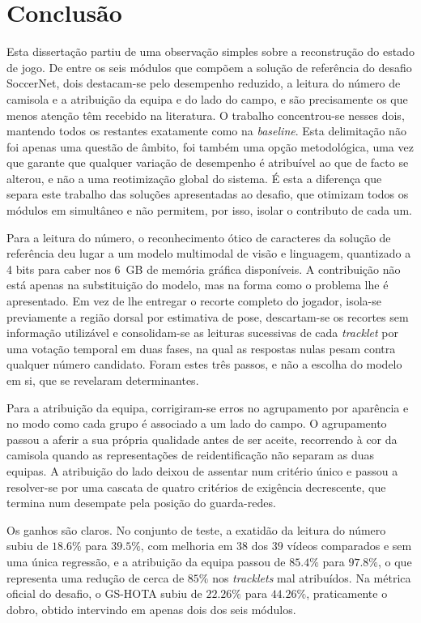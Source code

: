\chapter{Conclusão}\label{cap:conclusao}

Esta dissertação partiu de uma observação simples sobre a reconstrução do estado de jogo. De entre os seis módulos que compõem a solução de referência do desafio SoccerNet, dois destacam-se pelo desempenho reduzido, a leitura do número de camisola e a atribuição da equipa e do lado do campo, e são precisamente os que menos atenção têm recebido na literatura. O trabalho concentrou-se nesses dois, mantendo todos os restantes exatamente como na \emph{baseline}. Esta delimitação não foi apenas uma questão de âmbito, foi também uma opção metodológica, uma vez que garante que qualquer variação de desempenho é atribuível ao que de facto se alterou, e não a uma reotimização global do sistema. É esta a diferença que separa este trabalho das soluções apresentadas ao desafio, que otimizam todos os módulos em simultâneo e não permitem, por isso, isolar o contributo de cada um.

Para a leitura do número, o reconhecimento ótico de caracteres da solução de referência deu lugar a um modelo multimodal de visão e linguagem, quantizado a 4 bits para caber nos 6~GB de memória gráfica disponíveis. A contribuição não está apenas na substituição do modelo, mas na forma como o problema lhe é apresentado. Em vez de lhe entregar o recorte completo do jogador, isola-se previamente a região dorsal por estimativa de pose, descartam-se os recortes sem informação utilizável e consolidam-se as leituras sucessivas de cada \emph{tracklet} por uma votação temporal em duas fases, na qual as respostas nulas pesam contra qualquer número candidato. Foram estes três passos, e não a escolha do modelo em si, que se revelaram determinantes.

Para a atribuição da equipa, corrigiram-se erros no agrupamento por aparência e no modo como cada grupo é associado a um lado do campo. O agrupamento passou a aferir a sua própria qualidade antes de ser aceite, recorrendo à cor da camisola quando as representações de reidentificação não separam as duas equipas. A atribuição do lado deixou de assentar num critério único e passou a resolver-se por uma cascata de quatro critérios de exigência decrescente, que termina num desempate pela posição do guarda-redes.

Os ganhos são claros. No conjunto de teste, a exatidão da leitura do número subiu de $18.6\%$ para $39.5\%$, com melhoria em $38$ dos $39$ vídeos comparados e sem uma única regressão, e a atribuição da equipa passou de $85.4\%$ para $97.8\%$, o que representa uma redução de cerca de $85\%$ nos \emph{tracklets} mal atribuídos. Na métrica oficial do desafio, o GS-HOTA subiu de $22.26\%$ para $44.26\%$, praticamente o dobro, obtido intervindo em apenas dois dos seis módulos.

